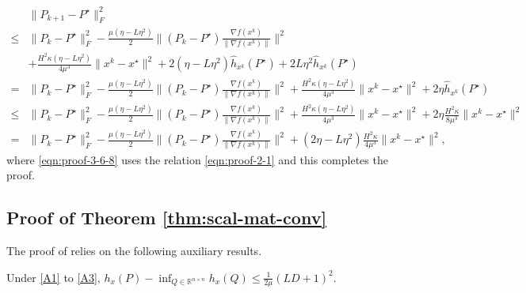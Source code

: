 \begin{align}
& \| P_{k + 1} - P^{\star} \|_F^2\nonumber \\
   \leq{} & \| P_k - P^{\star} \|_F^2 -
  \tfrac{\mu (\eta - L \eta^2)}{2} \| (P_k - P^{\star}) \tfrac{\nabla
  f (x^k)}{\| \nabla f (x^k) \|} \|^2 \nonumber\\
  & + \tfrac{H^2 \kappa (\eta - L \eta^2)}{4 \mu^3} \| x^k - x^{\star}
  \|^2 + 2 (\eta - L \eta^2) \hat{h}_{x^k} (P^{\star}) + 2 L \eta^2 \hat{h}_{x^k}
  (P^{\star}) \nonumber\\
  ={} & \| P_k - P^{\star} \|_F^2 - \tfrac{\mu (\eta - L \eta^2)}{2} \|
  (P_k - P^{\star}) \tfrac{\nabla f (x^k)}{\| \nabla f (x^k) \|} \|^2
  +  \tfrac{H^2 \kappa (\eta - L \eta^2)}{4 \mu^3} \| x^k - x^{\star}
  \|^2 + 2 \eta \hat{h}_{x^k} (P^{\star}) \nonumber\\
  \leq{} & \| P_k - P^{\star} \|_F^2 - \tfrac{\mu (\eta - L \eta^2)}{2}
  \| (P_k - P^{\star}) \tfrac{\nabla f (x^k)}{\| \nabla f (x^k) \|}
  \|^2 + \tfrac{H^2 \kappa (\eta - L \eta^2)}{4 \mu^3} \| x^k - x^{\star}
  \|^2 + 2 \eta \tfrac{H^2 \kappa}{8 \mu^3} \| x^k - x^{\star} \|^2 \label{eqn:proof-3-6-8} \\
  ={} & \| P_k - P^{\star} \|_F^2 - \tfrac{\mu (\eta - L \eta^2)}{2} \|
  (P_k - P^{\star}) \tfrac{\nabla f (x^k)}{\| \nabla f (x^k) \|} \|^2 +
  (2\eta - L \eta^2) \tfrac{H^2 \kappa}{4 \mu^3}\| x^k - x^{\star} \|^2, \nonumber
\end{align}
where \eqref{eqn:proof-3-6-8} uses the relation \eqref{eqn:proof-2-1} and this completes the proof.

\subsection{Proof of Theorem \ref{thm:scal-mat-conv}} \label{app:thm-pf-scal-mat-conv}

The proof of  relies on the following auxiliary results.

\begin{lem} \label{lem:scal-mat-conv-aux} Under \ref{A1} to \ref{A3}, $h_x (P) - \inf_{Q \in \mathbb{R}^{n \times n}} h_x (Q) \leq
  \tfrac{1}{2 \mu} (L D + 1)^2$.
\end{lem}

